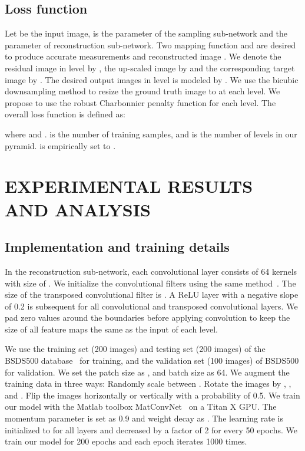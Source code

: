 \documentclass{article}
\begin{document}
\subsection{Loss function}
Let  be the input image,  is the parameter of the sampling sub-network and   the parameter of reconstruction sub-network. Two mapping function  and  are desired to produce accurate measurements and reconstructed image . We denote the residual image in level  by , the up-scaled image by  and the corresponding target image by . The desired output images in level  is modeled by . We use the bicubic downsampling method to resize the ground truth image  to  at each level. We propose to use the robust Charbonnier penalty function for each level. The overall loss function is defined as:

where  and .  is the number of training samples, and  is the number of levels in our pyramid.   is empirically set to .

\section{EXPERIMENTAL RESULTS AND ANALYSIS}
\subsection{Implementation and training details}
In the reconstruction sub-network, each convolutional layer consists of 64 kernels with size of . We initialize the convolutional filters using the same method~\cite{he2015delving}. The size of the transposed convolutional filter is . A ReLU layer with a negative slope of 0.2 is subsequent for all convolutional and transposed convolutional layers. We pad zero values around the boundaries before applying convolution to keep the size of all feature maps the same as the input of each level.

We use the training set (200 images) and testing set (200 images) of the BSDS500 database~\cite{arbelaez2011contour} for training, and the validation set (100 images) of BSDS500 for validation. We set the patch size as , and batch size as 64. We augment the training data in three ways:  Randomly scale between .  Rotate the images by , , and .  Flip the images horizontally or vertically with a probability of 0.5. We train our model with the Matlab toolbox MatConvNet~\cite{vedaldi2015matconvnet} on a Titan X GPU. The momentum parameter is set as 0.9 and weight decay as . The learning rate is initialized to  for all layers and decreased by a factor of 2 for every 50 epochs. We train our model for 200 epochs and each epoch iterates 1000 times.
\end{document}
